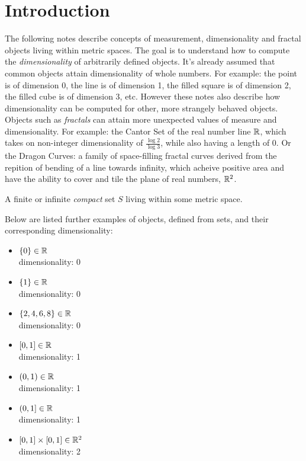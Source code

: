 \documentclass[11pt]{ekblite}
\begin{document}
\section{Introduction}
The following notes describe concepts of measurement, dimensionality and fractal objects living within metric spaces. The goal is to understand how to compute the \textit{dimensionality} of arbitrarily defined objects. It's already assumed that common objects attain dimensionality of whole numbers. For example: the point is of dimension 0, the line is of dimension 1, the filled square is of dimension 2, the filled cube is of dimension 3, etc. However these notes also describe how dimensionality can be computed for other, more strangely behaved objects. Objects such as \textit{fractals} can attain more unexpected values of measure and dimensionality. For example: the Cantor Set of the real number line $\mathbb{R}$, which takes on non-integer dimensionality of $\frac{\log 2}{\log 3}$, while also having a length of 0. Or the Dragon Curves: a family of space-filling fractal curves derived from the repition of bending of a line towards infinity, which acheive positive area and have the ability to cover and tile the plane of real numbers, $\mathbb{R}^2$.
\begin{definition}[Object]
	A finite or infinite \textit{compact} set $S$ living within some metric space.
\end{definition}
Below are listed further examples of objects, defined from sets, and their corresponding dimensionality:
\begin{itemize}
	\item $\{0\} \in \mathbb{R}$ \\[0.1in] dimensionality: 0
	\item $\{1\} \in \mathbb{R}$ \\[0.1in] dimensionality: 0
	\item $\{2,4,6,8\} \in \mathbb{R}$ \\[0.1in] dimensionality: 0
	\item $[0,1] \in \mathbb{R}$ \\[0.1in] dimensionality: 1
	\item $(0,1) \in \mathbb{R}$ \\[0.1in] dimensionality: 1
	\item $(0,1] \in \mathbb{R}$ \\[0.1in] dimensionality: 1
	\item  $[0,1] \times [0,1] \in \mathbb{R}^2$ \\[0.1in] dimensionality: 2
\end{itemize}
\end{document}
